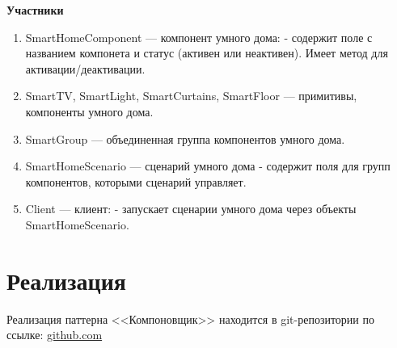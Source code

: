 \documentclass[PI,LAB]{HSEUniversity}
\begin{document}
\textbf{Участники}

\begin{enumerate}
  \item SmartHomeComponent --- компонент умного дома: - содержит поле с названием компонета и статус (активен или неактивен). Имеет метод для активации/деактивации. 
  \item SmartTV, SmartLight, SmartCurtains, SmartFloor --- примитивы, компоненты умного дома. 
  \item SmartGroup --- объединенная группа компонентов умного дома. 
  \item SmartHomeScenario --- сценарий умного дома - содержит поля для групп компонентов, которыми сценарий управляет.
  \item Client --- клиент: - запускает сценарии умного дома через объекты SmartHomeScenario.
\end{enumerate}

\section{Реализация}
Реализация паттерна <<Компоновщик>> находится в git-репозитории по ссылке: \href{https://github.com/rovany706/design-patterns/}{github.com}
\end{document}
